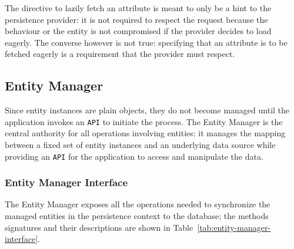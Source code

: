 \documentclass[english]{article}
\begin{document}
The directive to lazily fetch an attribute is meant to only be a hint to the persistence provider:
it is not required to respect the request because the behaviour or the entity is not compromised if the provider decides to load eagerly.
The converse however is not true: specifying that an attribute is to be fetched eagerly is a requirement that the provider must respect.

\subsection{Entity Manager}

Since entity instances are plain \java objects, they do not become managed until the application invokes an \texttt{API} to initiate the process.
The Entity Manager is the central authority for all operations involving entities:
it manages the mapping between a fixed set of entity instances and an underlying data source while providing an \texttt{API} for the application to access and manipulate the data.

\subsubsection{Entity Manager Interface}

The Entity Manager exposes all the operations needed to synchronize the managed entities in the persistence context to the database;
the methods signatures and their descriptions are shown in Table~\ref{tab:entity-manager-interface}.
\end{document}
